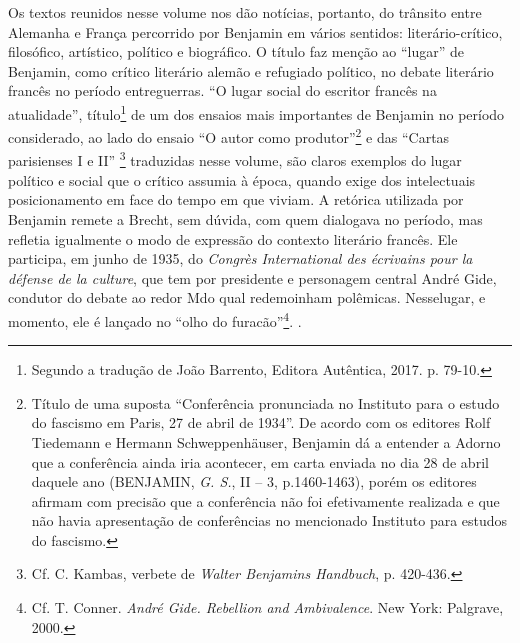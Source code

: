 Os textos reunidos nesse volume nos dão notícias, portanto, do trânsito
entre Alemanha e França percorrido por Benjamin em vários sentidos:
literário-crítico, filosófico, artístico, político e biográfico. O
título faz menção ao ``lugar'' de Benjamin, como crítico literário
alemão e refugiado político, no debate literário francês no período
entreguerras. ``O lugar social do escritor francês na atualidade'',
título\footnote{Segundo a tradução de João Barrento, Editora Autêntica,
  2017. p. 79-10.} de um dos ensaios mais importantes de Benjamin no
período considerado, ao lado do ensaio ``O autor como
produtor''\footnote{Título de uma suposta ``Conferência pronunciada no
  Instituto para o estudo do fascismo em Paris, 27 de abril de 1934''.
  De acordo com os editores Rolf Tiedemann e Hermann Schweppenhäuser,
  Benjamin dá a entender a Adorno que a conferência ainda iria
  acontecer, em carta enviada no dia 28 de abril daquele ano (BENJAMIN,
  \emph{G. S.}, II -- 3, p.1460-1463), porém os editores afirmam com
  precisão que a conferência não foi efetivamente realizada e que não
  havia apresentação de conferências no mencionado Instituto para
  estudos do fascismo.} e das ``Cartas parisienses I e II'' \footnote{Cf.
  C. Kambas, verbete de \emph{Walter Benjamins Handbuch}, p. 420-436.}
traduzidas nesse volume, são claros exemplos do lugar político e social
que o crítico assumia à época, quando exige dos intelectuais
posicionamento em face do tempo em que viviam. A retórica utilizada por
Benjamin remete a Brecht, sem dúvida, com quem dialogava no período, mas
refletia igualmente o modo de expressão do contexto literário francês.
Ele participa, em junho de 1935, do \emph{Congrès International des
écrivains pour la défense de la culture}, que tem por presidente e
personagem central André Gide, condutor do debate ao redor Mdo qual
redemoinham polêmicas. Nesselugar, e momento, ele é lançado no ``olho do
furacão''\footnote{Cf. T. Conner. \emph{André Gide. Rebellion and
  Ambivalence}. New York: Palgrave, 2000.}. .

